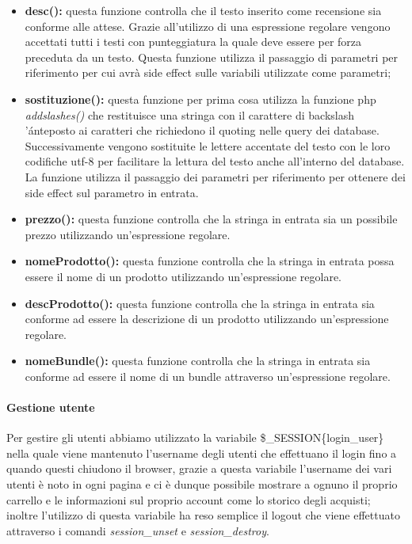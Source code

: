 \begin{itemize}
    \item \textbf{desc():} questa funzione controlla che il testo inserito come recensione sia conforme alle attese. Grazie all'utilizzo di una espressione regolare vengono accettati tutti i testi con punteggiatura la quale deve essere per forza preceduta da un testo.\newline
    Questa funzione utilizza il passaggio di parametri per riferimento per cui avrà side effect sulle variabili utilizzate come parametri;
    
    
    \item \textbf{sostituzione():} questa funzione per prima cosa utilizza la funzione php \emph{addslashes()} che restituisce una stringa con il carattere di backslash '\' anteposto ai caratteri che richiedono il quoting nelle query dei database.
    Successivamente vengono sostituite le lettere accentate del testo con le loro codifiche utf-8 per facilitare la lettura del testo anche all'interno del database.
    La funzione utilizza il passaggio dei parametri per riferimento per ottenere dei side effect sul parametro in entrata.
    
    \item \textbf{prezzo():} questa funzione controlla che la stringa in entrata sia un possibile prezzo utilizzando un'espressione regolare.
    
    \item \textbf{nomeProdotto():} questa funzione controlla che la stringa in entrata possa essere il nome di un prodotto utilizzando un'espressione regolare.
    
    \item \textbf{descProdotto():} questa funzione controlla che la stringa in entrata sia conforme ad essere la descrizione di un prodotto utilizzando un'espressione regolare.
    
    \item \textbf{nomeBundle():} questa funzione controlla che la stringa in entrata sia conforme ad essere il nome di un bundle attraverso un'espressione regolare.

\end{itemize}

\paragraph{Gestione utente} \Spazio
Per gestire gli utenti abbiamo utilizzato la variabile \$\_SESSION\{login\_user\} nella quale viene mantenuto l'username degli utenti che effettuano il login fino a quando questi chiudono il browser, grazie a questa variabile l'username dei vari utenti è noto in ogni pagina e ci è dunque possibile mostrare a ognuno il proprio carrello e le informazioni sul proprio account come lo storico degli acquisti;
inoltre l'utilizzo di questa variabile ha reso semplice il logout che viene effettuato attraverso i comandi \emph{session\_unset} e \emph{session\_destroy}.

